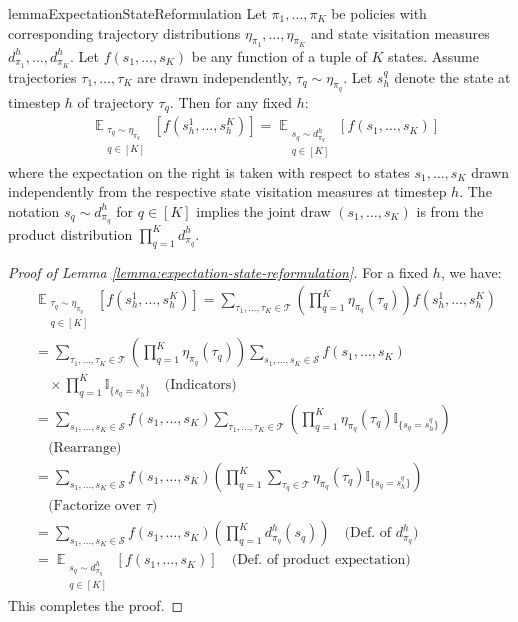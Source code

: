 \documentclass{article}
\newcommand{\Tau}{\mathcal{T}}
\DeclareMathOperator*{\E}{\mathbb{E}} %
\newcommand{\Scal}{\mathcal{S}}
\begin{document}
\begin{restatable}{lemma}{ExpectationStateReformulation}
\label{lemma:expectation-state-reformulation}
Let $\pi_1, \dots, \pi_K$ be policies with corresponding trajectory distributions $\eta_{\pi_1}, \dots, \eta_{\pi_K}$ and state visitation measures $d^h_{\pi_1}, \dots, d^h_{\pi_K}$. Let $f(s_1, \dots, s_K)$ be any function of a tuple of $K$ states. Assume trajectories $\tau_1, \dots, \tau_K$ are drawn independently, $\tau_q \sim \eta_{\pi_q}$. Let $s^q_h$ denote the state at timestep $h$ of trajectory $\tau_q$. Then for any fixed $h$:
\begin{align*}
&\E_{\substack{\tau_q \sim \eta_{\pi_q} \\ q \in [K]}} \left[ f(s^1_h, \dots, s^K_h) \right] = \E_{\substack{s_q \sim d^h_{\pi_q} \\ q \in [K]}} \left[ f(s_1, \dots, s_K) \right]
\end{align*}
where the expectation on the right is taken with respect to states $s_1, \dots, s_K$ drawn independently from the respective state visitation measures at timestep $h$. The notation $s_q \sim d^h_{\pi_q}$ for $q \in [K]$ implies the joint draw $(s_1, \dots, s_K)$ is from the product distribution $\prod_{q=1}^K d^h_{\pi_q}$.
\end{restatable}

\begin{proof}[Proof of Lemma \ref{lemma:expectation-state-reformulation}]
For a fixed $h$, we have:
\begin{align*}
&\E_{\substack{\tau_q \sim \eta_{\pi_q} \\ q \in [K]}} \left[ f(s^1_h, \dots, s^K_h) \right] = 
 \sum_{\tau_1, \dots, \tau_K \in \Tau} \left( \prod_{q=1}^K \eta_{\pi_q}(\tau_q) \right) f(s^1_h, \dots, s^K_h) \\
&= \sum_{\tau_1, \dots, \tau_K \in \Tau} \left( \prod_{q=1}^K \eta_{\pi_q}(\tau_q) \right) \sum_{s_1, \dots, s_K \in \Scal} f(s_1, \dots, s_K) \\
&\quad \times \prod_{q=1}^K \mathbb{I}_{\{s_q = s^q_h\}} \quad \text{(Indicators)} \\
&= \sum_{s_1, \dots, s_K \in \Scal} f(s_1, \dots, s_K) \sum_{\tau_1, \dots, \tau_K \in \Tau} \left( \prod_{q=1}^K \eta_{\pi_q}(\tau_q) \mathbb{I}_{\{s_q = s^q_h\}} \right) \\
&\quad \text{(Rearrange)} \\
&= \sum_{s_1, \dots, s_K \in \Scal} f(s_1, \dots, s_K) \left( \prod_{q=1}^K \sum_{\tau_q \in \Tau} \eta_{\pi_q}(\tau_q) \mathbb{I}_{\{s_q = s^q_h\}} \right) \\
&\quad \text{(Factorize over } \tau \text{)} \\
&= \sum_{s_1, \dots, s_K \in \Scal} f(s_1, \dots, s_K) \left( \prod_{q=1}^K d^h_{\pi_q}(s_q) \right) \quad \text{(Def.\ of } d^h_{\pi_q} \text{)} \\
&= \E_{\substack{s_q \sim d^h_{\pi_q} \\ q \in [K]}} \left[ f(s_1, \dots, s_K) \right] \quad \text{(Def.\ of product expectation)}
\end{align*}
This completes the proof.
\end{proof}
\end{document}
